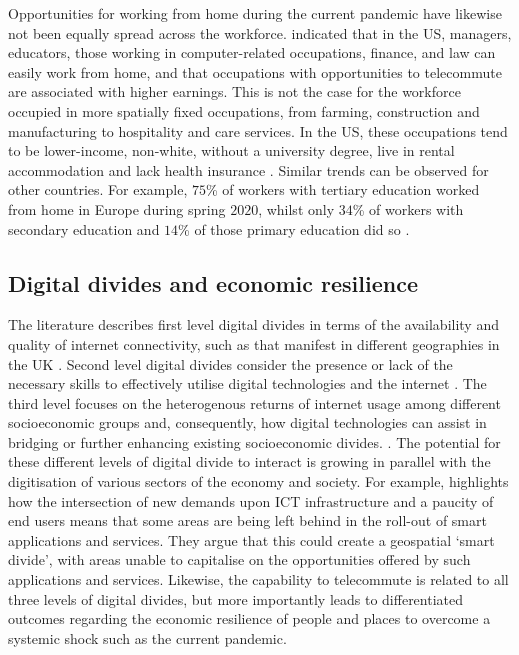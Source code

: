\documentclass[]{interact}
\theoremstyle{plain}%
\theoremstyle{definition}
\theoremstyle{remark}
\begin{document}
Opportunities for working from home during the current pandemic have
likewise not been equally spread across the workforce.
\citet{NBERw26948} indicated that in the US, managers, educators, those
working in computer-related occupations, finance, and law can easily
work from home, and that occupations with opportunities to telecommute
are associated with higher earnings. This is not the case for the
workforce occupied in more spatially fixed occupations, from farming,
construction and manufacturing to hospitality and care services. In the
US, these occupations tend to be lower-income, non-white, without a
university degree, live in rental accommodation and lack health
insurance \citep{NBERw27085}. Similar trends can be observed for other
countries. For example, \(75\)\% of workers with tertiary education
worked from home in Europe during spring \(2020\), whilst only \(34\)\%
of workers with secondary education and \(14\)\% of those primary
education did so \citep{eurofound2020}.

\hypertarget{sec:2.2}{%
\subsection{Digital divides and economic resilience}\label{sec:2.2}}

The literature describes first level digital divides in terms of the
availability and quality of internet connectivity, such as that manifest
in different geographies in the UK
\citep{riddlesden2014broadband, philip2017digital}. Second level digital
divides consider the presence or lack of the necessary skills to
effectively utilise digital technologies and the internet
\citep{blank2014dimensions, van2011internet}. The third level focuses on
the heterogenous returns of internet usage among different socioeconomic
groups and, consequently, how digital technologies can assist in
bridging or further enhancing existing socioeconomic divides.
\citep{stern2009levels, van2014digital, van2015third}. The potential for
these different levels of digital divide to interact is growing in
parallel with the digitisation of various sectors of the economy and
society. For example, \citet{li2020challenges} highlights how the
intersection of new demands upon ICT infrastructure and a paucity of end
users means that some areas are being left behind in the roll-out of
smart applications and services. They argue that this could create a
geospatial `smart divide', with areas unable to capitalise on the
opportunities offered by such applications and services. Likewise, the
capability to telecommute is related to all three levels of digital
divides, but more importantly leads to differentiated outcomes regarding
the economic resilience of people and places to overcome a systemic
shock such as the current pandemic.
\end{document}
